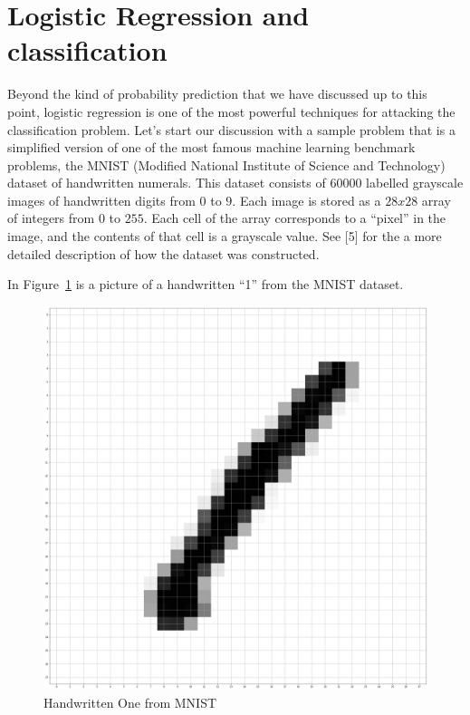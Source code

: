 \documentclass[
  11pt,
  letterpaper,
]{scrbook}
\theoremstyle{plain}
\theoremstyle{plain}
\theoremstyle{remark}
\begin{document}
\hypertarget{logistic-regression-and-classification}{%
\section{Logistic Regression and
classification}\label{logistic-regression-and-classification}}

Beyond the kind of probability prediction that we have discussed up to
this point, logistic regression is one of the most powerful techniques
for attacking the classification problem. Let's start our discussion
with a sample problem that is a simplified version of one of the most
famous machine learning benchmark problems, the MNIST (Modified National
Institute of Science and Technology) dataset of handwritten numerals.
This dataset consists of \(60000\) labelled grayscale images of
handwritten digits from \(0\) to \(9\). Each image is stored as a
\(28x28\) array of integers from \(0\) to \(255\). Each cell of the
array corresponds to a ``pixel'' in the image, and the contents of that
cell is a grayscale value. See {[}5{]} for the a more detailed
description of how the dataset was constructed.

In Figure~\ref{fig-MNISTOne} is a picture of a handwritten ``1'' from
the MNIST dataset.

\begin{figure}

{\centering \includegraphics[width=1\textwidth,height=\textheight]{chapters/img/MNISTOne.png}

}

\caption{\label{fig-MNISTOne}Handwritten One from MNIST}

\end{figure}
\end{document}
